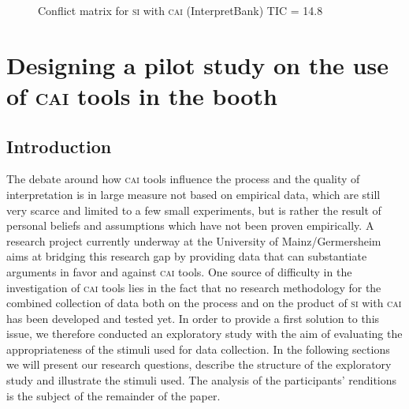 \documentclass[output=paper]{langsci/langscibook}
\begin{document}
\begin{figure}
{}
\caption{Conflict matrix for \textsc{si} with \textsc{cai} (InterpretBank) TIC = 14.8\label{fig:prandi:6}
}
\end{figure}

\section{Designing a pilot study on the use of \textsc{cai} tools in the booth}\label{sec:prandi:3}
\subsection{Introduction}\label{sec:prandi:3.1}
The debate around how \textsc{cai} tools influence the process and the quality of interpretation is in large measure not based on empirical data, which are still very scarce and limited to a few small experiments, but is rather the result of personal beliefs and assumptions which have not been proven empirically. A research project currently underway at the University of Mainz\slash Germersheim \citep{Prandi2016, Prandi2017a, Prandi2017b} aims at bridging this research gap by providing data that can substantiate arguments in favor and against \textsc{cai} tools. One source of difficulty in the investigation of \textsc{cai} tools lies in the fact that no research methodology for the combined collection of data both on the process and on the product of \textsc{si} with \textsc{cai} has been developed and tested yet. In order to provide a first solution to this issue, we therefore conducted an exploratory study with the aim of evaluating the appropriateness of the stimuli used for data collection. In the following sections we will present our research questions, describe the structure of the exploratory study and illustrate the stimuli used. The analysis of the participants’ renditions is the subject of the remainder of the paper.
\end{document}
